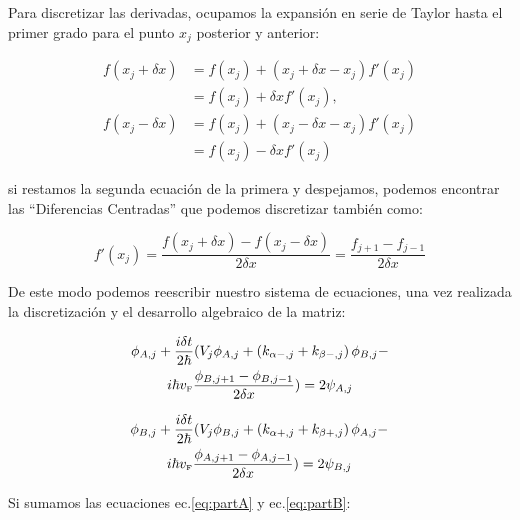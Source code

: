     Para discretizar las derivadas, ocupamos la expansión en serie de Taylor hasta el primer grado para el punto $x_j$ posterior y anterior:

    \begin{align}
        \label{eq:TaylorBeforeAndAfter}
        f(x_j+\delta x)&=f(x_j) + (x_j+\delta x-x_j)f'(x_j)\nonumber\\
        &=f(x_j)+\delta xf'(x_j),\nonumber\\
        f(x_j-\delta x)&=f(x_j) + (x_j-\delta x-x_j)f'(x_j)\nonumber\\
        &=f(x_j)-\delta xf'(x_j)
    \end{align}

    \noindent si restamos la segunda ecuación de la primera y despejamos, podemos encontrar las ``Diferencias Centradas'' que podemos discretizar también como:

    \begin{equation}
        \label{eq:diferenciasCentradas}
        f'(x_j)=\frac{f(x_j+\delta x)-f(x_j-\delta x)}{2\delta x} = \frac{f_{j+1}-f_{j-1}}{2\delta x}
    \end{equation}

    De este modo podemos reescribir nuestro sistema de ecuaciones, una vez realizada la discretización y el desarrollo algebraico de la matriz:

    \begin{multline}
        \label{eq:partA}
        \phi_{A, j} + \frac{i\delta t}{2\hbar}(V_j\phi_{A,j} + \left(k_{\alpha-,j}+k_{\beta-,j}\right)\phi_{B,j}-\\
        i\hbar v_{\mbox{\tiny F}}\frac{\phi_{B, j+1}-\phi_{B, j-1}}{2\delta x}) = 2\psi_{A,j}
    \end{multline}

    \begin{multline}
        \label{eq:partB}
        \phi_{B, j} + \frac{i\delta t}{2\hbar}(V_j\phi_{B,j} + \left(k_{\alpha+,j}+k_{\beta+,j}\right)\phi_{A,j}-\\
        i\hbar v_{\mbox{\tiny F}}\frac{\phi_{A, j+1}-\phi_{A, j-1}}{2\delta x}) = 2\psi_{B,j}
    \end{multline}
    
    Si sumamos las ecuaciones ec.\eqref{eq:partA} y ec.\eqref{eq:partB}:

